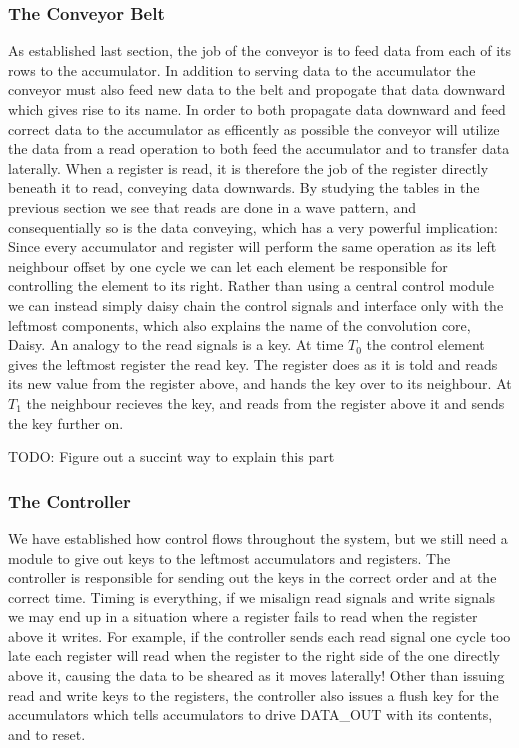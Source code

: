 \subsubsection{The Conveyor Belt}
As established last section, the job of the conveyor is to feed data from each of its rows to the accumulator.
In addition to serving data to the accumulator the conveyor must also feed new data to the belt and propogate that data downward which gives rise to its name.
In order to both propagate data downward and feed correct data to the accumulator as efficently as possible the conveyor will utilize the data from a read operation to both feed the accumulator and to transfer data laterally.
When a register is read, it is therefore the job of the register directly beneath it to read, conveying data downwards.
By studying the tables in the previous section we see that reads are done in a wave pattern, and consequentially so is the data conveying, which has a very powerful implication:
Since every accumulator and register will perform the same operation as its left neighbour offset by one cycle we can let each element be responsible for controlling the element to its right.
Rather than using a central control module we can instead simply daisy chain the control signals and interface only with the leftmost components, which also explains the name of the convolution core, Daisy.
An analogy to the read signals is a key. At time $T_{0}$ the control element gives the leftmost register the read key. 
The register does as it is told and reads its new value from the register above, and hands the key over to its neighbour. 
At $T_{1}$ the neighbour recieves the key, and reads from the register above it and sends the key further on.

TODO: Figure out a succint way to explain this part

\subsubsection{The Controller}
We have established how control flows throughout the system, but we still need a module to give out keys to the leftmost accumulators and registers.
The controller is responsible for sending out the keys in the correct order and at the correct time.
Timing is everything, if we misalign read signals and write signals we may end up in a situation where a register fails to read when the register above it writes.
For example, if the controller sends each read signal one cycle too late each register will read when the register to the right side of the one directly above it, causing the data to be sheared as it moves laterally!
Other than issuing read and write keys to the registers, the controller also issues a flush key for the accumulators which tells accumulators to drive DATA\_OUT with its contents, and to reset.

